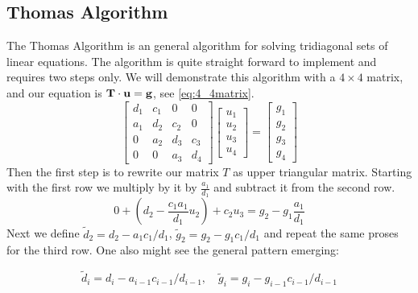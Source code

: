 \subsection*{Thomas Algorithm}

The Thomas Algorithm is an general algorithm for solving tridiagonal sets of
linear equations. The algorithm is quite straight forward to implement and
requires two steps only.
We will demonstrate this algorithm with a $4 \times 4$ matrix, and
our equation is $\mathbf{T} \cdot \mathbf{u} = \mathbf{g}$, see \cref{eq:4_4matrix}.
\begin{equation}\label{eq:4_4matrix}
  \begin{bmatrix}
    d_1 & c_1 & 0 & 0 \\
    a_1 & d_2 & c_2 & 0 \\
    0 & a_2 & d_3 & c_3  \\
    0 & 0 & a_3 & d_4
  \end{bmatrix} \begin{bmatrix}
    u_1 \\ u_2 \\ u_3 \\ u_4
  \end{bmatrix} = \begin{bmatrix}
    g_1 \\ g_2 \\ g_3 \\ g_4
  \end{bmatrix}
\end{equation}
Then the first step is to rewrite our matrix $T$ as upper triangular matrix.
Starting with the first row we multiply by it by $\frac{a_1}{d_1}$ and subtract
it from the second row.
\begin{equation*}
  0 + \left(d_2 - \frac{c_1 a_1}{d_1}u_2 \right)+ c_2u_3 = g_2 -g_1
  \frac{a_1}{d_1}
\end{equation*}
Next we define $\tilde{d}_2 = d_2 - a_1 c_1/d_1$,
$\tilde{g}_2 =  g_2 - g_1 c_1/d_1$ and repeat the same proses for the third row.
One also might see the general pattern emerging:

\begin{equation}
  \tilde{d}_i = d_i- a_{i-1} c_{i-1}/d_{i-1}, \quad \tilde{g}_i =  g_i - g_{i-1} c_{i-1}/d_{i-1}
\end{equation}

